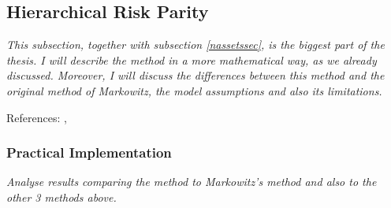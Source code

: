 \subsection{Hierarchical Risk Parity}
    \textit{This subsection, together with subsection \ref{nassetssec}, is the biggest part of the thesis. I will describe the method in a more mathematical way, as we already discussed. Moreover, I will discuss the differences between this method and the original method of Markowitz, the model assumptions and also its limitations.}
    
    References: \cite{lopezmain}, \cite{berndscherer} \cite{stefanjansen}
    
    \subsubsection{Practical Implementation}
        \textit{Analyse results comparing the method to Markowitz's method and also to the other 3 methods above.}